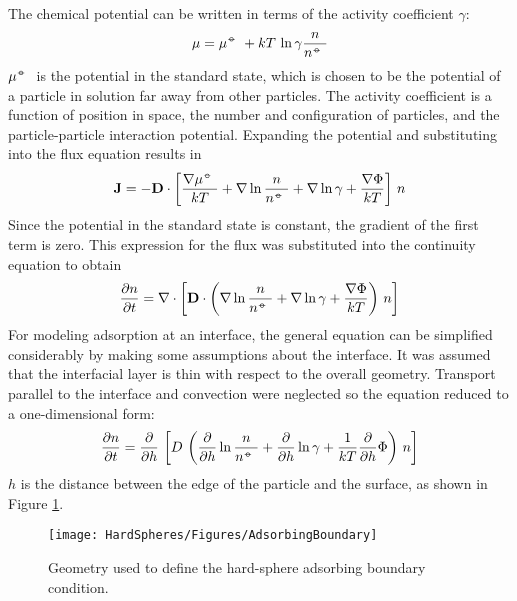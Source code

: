 The chemical potential can be written in terms of the activity coefficient
$\gamma$:\begin{equation} \label{eq:ChemicalPotential}
\mu = \mu^\standardstate + kT \, \ln \gamma \frac{n}{n^ \standardstate}
\end{equation}\( \mu^\standardstate \) is the potential in the standard state,
which is chosen to be the potential of a particle in solution far
away from other particles. The activity coefficient is a function
of position in space, the number and configuration of particles, and
the particle-particle interaction potential. Expanding the potential
and substituting into the flux equation results in \begin{equation} \label{eq:Flux ito Potential}
\mathbf{J} = -\mathbf{D} \cdot \left[ \frac{\nabla \mu^\standardstate}{kT}
 + \nabla \ln \frac{n}{n^\standardstate} + \nabla \ln \gamma
 + \frac{\nabla \Phi}{kT}
 \right] \, n
\end{equation}Since the potential in the standard state is constant, the gradient
of the first term is zero. This expression for the flux was substituted
into the continuity equation to obtain\begin{equation} \label{eq:PDE 1}
\frac{\partial n}{ \partial t} =
 \nabla \cdot \left[ \mathbf{D} \cdot \left(
 \nabla \ln \frac{n}{n^\standardstate}
 + \nabla \ln \gamma + \frac{\nabla \Phi}{kT}
 \right) \, n \right]
\end{equation}For modeling adsorption at an interface, the general equation can
be simplified considerably by making some assumptions about the interface.
It was assumed that the interfacial layer is thin with respect to
the overall geometry. Transport parallel to the interface and convection
were neglected so the equation reduced to a one-dimensional form:\begin{equation} \label{eq:PDE 2}
\frac{\partial n}{ \partial t} =
 \frac{\partial}{ \partial h} \, \left[ D \, 
 \left(
 \frac{\partial}{ \partial h} \ln \frac{n}{n^\standardstate} 
 + \frac{\partial}{ \partial h} \ln \gamma
 + \frac{1}{kT} \frac{\partial}{ \partial h} \Phi
 \right) \, n \right]
\end{equation}$h$ is the distance between the edge of the particle and the surface,
as shown in Figure \ref{fig:Geometry}. %
\begin{figure}
\texttt{[image: HardSpheres/Figures/AdsorbingBoundary]}

\caption{\label{fig:Geometry}Geometry used to define the hard-sphere adsorbing
boundary condition.}


%
\end{figure}


